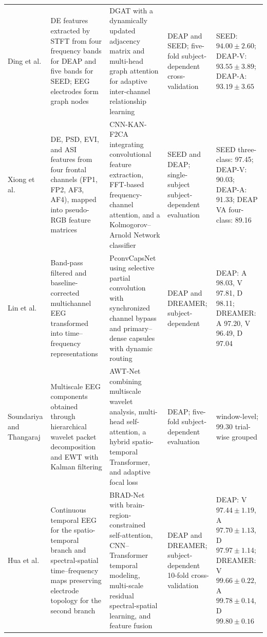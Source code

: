 \documentclass{WileyMSP-template}
\newcommand{\lightrowsep}{%
    \arrayrulecolor{lightrowgray}%
    \specialrule{0.30pt}{3.5pt}{3.5pt}%
    \arrayrulecolor{black}%
}
\begin{document}
\begin{table}
\begin{tabularx}{\textheight}{
>{\raggedright\arraybackslash}p{3.15cm}
>{\raggedright\arraybackslash}X
>{\raggedright\arraybackslash}X
>{\raggedright\arraybackslash}p{3.65cm}
>{\raggedright\arraybackslash}p{5.15cm}}
\lightrowsep

Ding et al. \cite{ding2025dgat} &
DE features extracted by STFT from four frequency bands for DEAP and five bands for SEED;
EEG electrodes form graph nodes &
DGAT with a dynamically updated adjacency matrix and multi-head graph attention
for adaptive inter-channel relationship learning &
DEAP and SEED; five-fold subject-dependent cross-validation &
SEED: $94.00 \pm 2.60$;
DEAP-V: $93.55 \pm 3.89$;
DEAP-A: $93.19 \pm 3.65$ \\

\lightrowsep

Xiong et al. \cite{xiong2025cnnkanf2ca} &
DE, PSD, EVI, and ASI features from four frontal channels
(FP1, FP2, AF3, AF4), mapped into pseudo-RGB feature matrices &
CNN-KAN-F2CA integrating convolutional feature extraction,
FFT-based frequency-channel attention, and a Kolmogorov--Arnold Network classifier &
SEED and DEAP; single-subject subject-dependent evaluation &
SEED three-class: 97.45;
DEAP-V: 90.03;
DEAP-A: 91.33;
DEAP VA four-class: 89.16 \\

\lightrowsep

Lin et al. \cite{lin2026pconvcapsnet} &
Band-pass filtered and baseline-corrected multichannel EEG transformed
into time--frequency representations &
PconvCapsNet using selective partial convolution with synchronized channel bypass
and primary--dense capsules with dynamic routing &
DEAP and DREAMER; subject-dependent &
DEAP: A 98.03, V 97.81, D 98.11;
DREAMER: A 97.20, V 96.49, D 97.04 \\

\lightrowsep

Soundariya and Thangaraj \cite{soundariya2026awtnet} &
Multiscale EEG components obtained through hierarchical wavelet packet decomposition
and EWT with Kalman filtering &
AWT-Net combining multiscale wavelet analysis, multi-head self-attention,
a hybrid spatio-temporal Transformer, and adaptive focal loss &
DEAP; five-fold subject-dependent evaluation &
99.61 window-level;
99.30 trial-wise grouped \\

\lightrowsep

Hua et al. \cite{hua2026bradnet} &
Continuous temporal EEG for the spatio-temporal branch and spectral-spatial
time--frequency maps preserving electrode topology for the second branch &
BRAD-Net with brain-region-constrained self-attention,
CNN--Transformer temporal modeling,
multi-scale residual spectral-spatial learning, and feature fusion &
DEAP and DREAMER; subject-dependent 10-fold cross-validation &
DEAP: V $97.44 \pm 1.19$, A $97.70 \pm 1.13$, D $97.97 \pm 1.14$;
DREAMER: V $99.66 \pm 0.22$, A $99.78 \pm 0.14$, D $99.80 \pm 0.16$ \\


\end{tabularx}
\end{table}
\end{document}
